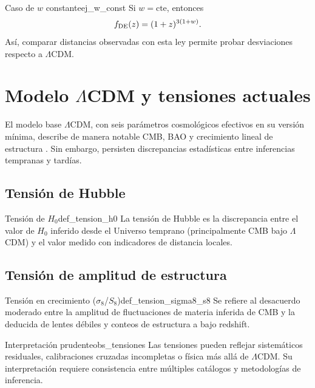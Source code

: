 \begin{ejemplo}{Caso de $w$ constante}{ej_w_const}
Si $w=\text{cte}$, entonces
\begin{equation}
  f_{\rm DE}(z)=(1+z)^{3(1+w)}.
\end{equation}
Así, comparar distancias observadas con esta ley permite probar desviaciones respecto a $\Lambda$CDM.
\end{ejemplo}

\section{Modelo $\Lambda$CDM y tensiones actuales}
\label{sec:lcdm_tensiones}

El modelo base $\Lambda$CDM, con seis parámetros cosmológicos efectivos en su versión mínima, describe de manera notable CMB, BAO y crecimiento lineal de estructura \cite{Planck2020}. Sin embargo, persisten discrepancias estadísticas entre inferencias tempranas y tardías.

\subsection{Tensión de Hubble}

\begin{definicion}{Tensión de $H_0$}{def_tension_h0}
La tensión de Hubble es la discrepancia entre el valor de $H_0$ inferido desde el Universo temprano (principalmente CMB bajo $\Lambda$CDM) y el valor medido con indicadores de distancia locales.
\end{definicion}

\subsection{Tensión de amplitud de estructura}

\begin{definicion}{Tensión en crecimiento ($\sigma_8$/$S_8$)}{def_tension_sigma8_s8}
Se refiere al desacuerdo moderado entre la amplitud de fluctuaciones de materia inferida de CMB y la deducida de lentes débiles y conteos de estructura a bajo redshift.
\end{definicion}

\begin{observacion}{Interpretación prudente}{obs_tensiones}
Las tensiones pueden reflejar sistemáticos residuales, calibraciones cruzadas incompletas o física más allá de $\Lambda$CDM. Su interpretación requiere consistencia entre múltiples catálogos y metodologías de inferencia.
\end{observacion}


